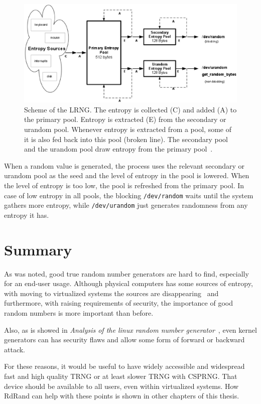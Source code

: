 \begin{figure}[h!]
  \centering
 \includegraphics[width=16cm,keepaspectratio]{fig/LRNG} %
\caption{Scheme of the LRNG. The entropy is collected (C) and added (A) to the primary pool. Entropy is extracted (E) from the secondary or urandom pool. Whenever entropy is extracted from a pool, some of it is also fed back into this pool (broken line). The secondary pool and the urandom pool draw entropy from the primary pool~\cite{AnalysisOfLinuxRNG}.}
\label{fig:LRNG}
\end{figure}

When a random value is generated, the process uses the relevant secondary or urandom pool as the seed and the level of entropy in the pool is lowered. When the level of entropy is too low, the pool is refreshed from the primary pool. In case of low entropy in all pools, the blocking {\tt /dev/random} waits until the system gathers more entropy, while {\tt /dev/urandom} just generates randomness from any entropy it has.



\section{Summary}
As was noted, good true random number generators are hard to find, especially for an end-user usage. Although physical computers has some sources of entropy, with moving to virtualized systems the sources are disappearing~\cite{AnalysisOfEntropyLevels} and furthermore, with raising requirements of security, the importance of good random numbers is more important than before.

Also, as is showed in {\em Analysis of the linux random number generator}~\cite{AnalysisOfLinuxRNG}, even kernel generators can has security flaws and allow some form of forward or backward attack. 

For these reasons, it would be useful to have widely accessible and widespread fast and high quality TRNG or at least slower TRNG with CSPRNG. That device should be available to all users, even within virtualized systems. How RdRand can help with these points is shown in other chapters of this thesis.
